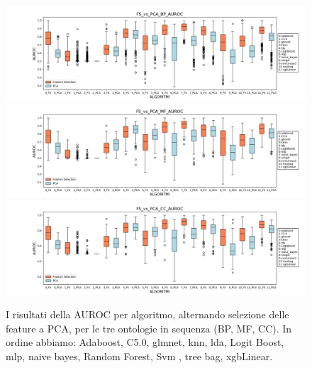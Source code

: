 \documentclass[12pt]{report}
\begin{document}
\begin{figure}[h!]
\centering
\hspace*{-0.9in}
\includegraphics[scale=0.43]{./images/FS_vs_PCA_BP_AUROC.png}
\hspace*{-0.9in}
\includegraphics[scale=0.43]{./images/FS_vs_PCA_MF_AUROC.png}
\hspace*{-0.9in}
\includegraphics[scale=0.43]{./images/FS_vs_PCA_CC_AUROC.png}
\caption{\footnotesize{I risultati della AUROC per algoritmo, alternando selezione delle feature a PCA, per le tre ontologie in sequenza (BP, MF, CC). In ordine abbiamo: Adaboost, C5.0, glmnet, knn, lda, Logit Boost, mlp, naive bayes, Random Forest, Svm , tree bag, xgbLinear.}}
\label{versusAUROC}
\end{figure}
\end{document}

